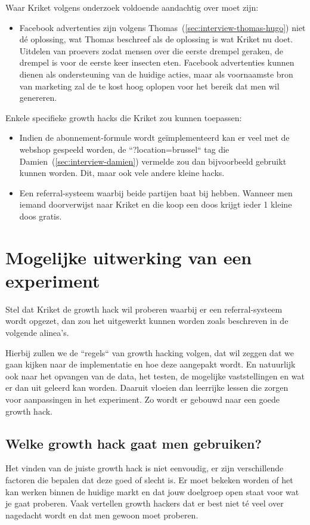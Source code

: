 Waar Kriket volgens onderzoek voldoende aandachtig over moet zijn:
\begin{itemize}
	\item Facebook advertenties zijn volgens Thomas~(\ref{sec:interview-thomas-hugo}) niet dé oplossing, wat Thomas beschreef als de oplossing is wat Kriket nu doet. Uitdelen van proevers zodat mensen over die eerste drempel geraken, de drempel is voor de eerste keer insecten eten. Facebook advertenties kunnen dienen als ondersteuning van de huidige acties, maar als voornaamste bron van marketing zal de te kost hoog oplopen voor het bereik dat men wil genereren.
\end{itemize}

Enkele specifieke growth hacks die Kriket zou kunnen toepassen:
\begin{itemize}
	\item Indien de abonnement-formule wordt geïmplementeerd kan er veel met de webshop gespeeld worden, de ``?location=brussel`` tag die Damien~(\ref{sec:interview-damien}) vermelde zou dan bijvoorbeeld gebruikt kunnen worden. Dit, maar ook vele andere kleine hacks.
	\item Een referral-systeem waarbij beide partijen baat bij hebben. Wanneer men iemand doorverwijst naar Kriket en die koop een doos krijgt ieder 1 kleine doos gratis.
\end{itemize}

\section{Mogelijke uitwerking van een experiment}
\label{sec:mogelijke-uitwerking-van-een-experiment}
Stel dat Kriket de growth hack wil proberen waarbij er een referral-systeem wordt opgezet, dan zou het uitgewerkt kunnen worden zoals beschreven in de volgende alinea's.

Hierbij zullen we de ``regels`` van growth hacking volgen, dat wil zeggen dat we gaan kijken naar de implementatie en hoe deze aangepakt wordt. En natuurlijk ook naar het opvangen van de data, het testen, de mogelijke vaststellingen en wat er dan uit geleerd kan worden. Daaruit vloeien dan leerrijke lessen die zorgen voor aanpassingen in het experiment. Zo wordt er gebouwd naar een goede growth hack.

\subsection{Welke growth hack gaat men gebruiken?}
\label{subsec:welke-growth-hack}
Het vinden van de juiste growth hack is niet eenvoudig, er zijn verschillende factoren die bepalen dat deze goed of slecht is. Er moet bekeken worden of het kan werken binnen de huidige markt en dat jouw doelgroep open staat voor wat je gaat proberen. Vaak vertellen growth hackers dat er best niet té veel over nagedacht wordt en dat men gewoon moet proberen. 

